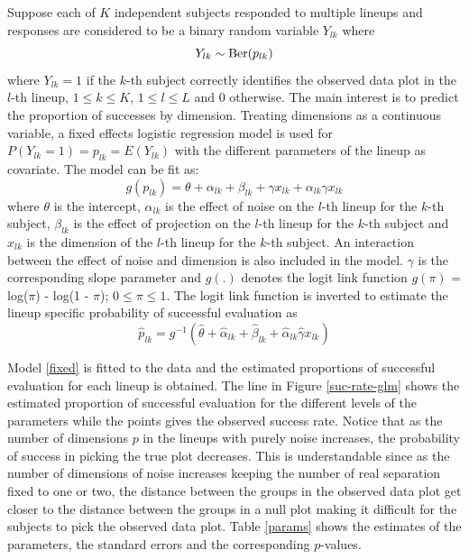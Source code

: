 \documentclass[12]{article}
\begin{document}
Suppose each of $K$ independent subjects responded to multiple lineups and responses are considered to be a binary random variable $Y_{lk}$ where $$Y_{lk} \sim \hbox{Ber}(p_{lk})$$ where $Y_{lk} = 1$ if the $k$-th subject correctly identifies the observed data plot in the $l$-th lineup, $1 \leq k \leq K$, $1 \leq l \leq L$ and 0 otherwise. The main interest is to predict the proportion of successes by dimension. Treating dimensions as a continuous variable, a fixed effects logistic regression model is used for $P(Y_{lk} = 1) = p_{lk} = E(Y_{lk})$ with the different parameters of the lineup as covariate.
The model can be fit as:
\begin{equation}
g(p_{lk}) = \theta + \alpha_{lk} + \beta_{lk} + \gamma x_{lk} + \alpha_{lk} \gamma x_{lk} \label{fixed}
\end{equation}
where $\theta$ is the intercept, $\alpha_{lk}$ is the effect of noise on the $l$-th lineup for the $k$-th subject,
$\beta_{lk}$ is the effect of projection on the $l$-th lineup for the $k$-th subject 
and $x_{lk}$ is the dimension of the $l$-th lineup for the $k$-th subject. An interaction between the effect of noise and dimension is also included in the model. $\gamma$ is the corresponding slope parameter and $g(.)$ denotes the logit link function $g(\pi)$ = log($\pi$) - log(1 - $\pi$); $0 \leq \pi \leq 1$. The logit link function is inverted to estimate the lineup specific probability of successful evaluation as 
\begin{equation}
\hat{p}_{lk} = g^{-1}(\hat{\theta} + \hat{\alpha}_{lk} + \hat{\beta}_{lk} + \hat{\alpha}_{lk} \hat{\gamma} x_{lk}) \label{invert}
\end{equation}

Model \ref{fixed} is fitted to the data and the estimated proportions of successful evaluation for each lineup is obtained.  The line in Figure \ref{suc-rate-glm} shows the estimated proportion of successful evaluation for the different levels of the parameters while the points gives the observed success rate. Notice that as the number of dimensions $p$ in the lineups with purely noise increases, the probability of success in picking the true plot decreases. This is understandable since as the number of dimensions of noise increases keeping the number of real separation fixed to one or two, the distance between the groups in the observed data plot get closer to the distance between the groups in a null plot making it difficult for the subjects to pick the observed data plot. Table \ref{params} shows the estimates of the parameters, the standard errors and the corresponding $p$-values.
\end{document}
